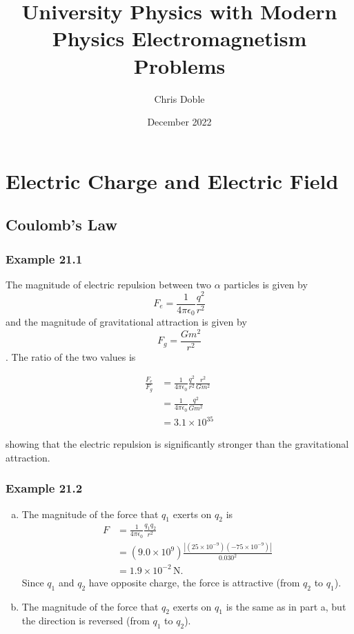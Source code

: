\documentclass{article}
\title{University Physics with Modern Physics Electromagnetism Problems}
\author{Chris Doble}
\date{December 2022}
\begin{document}
\maketitle

\tableofcontents

\setcounter{section}{20}
\section{Electric Charge and Electric Field}

\setcounter{subsection}{2}
\subsection{Coulomb's Law}

\subsubsection{Example 21.1}

The magnitude of electric repulsion between two $\alpha$ particles is given by \[F_e = \frac{1}{4\pi\epsilon_0}\frac{q^2}{r^2}\] and the magnitude of gravitational attraction is given by \[F_g = \frac{Gm^2}{r^2}\]. The ratio of the two values is

\begin{align*}
  \frac{F_e}{F_g} & = \frac{1}{4\pi\epsilon_0}\frac{q^2}{r^2}\frac{r^2}{Gm^2} \\
                  & = \frac{1}{4\pi\epsilon_0}\frac{q^2}{Gm^2}                \\
                  & = 3.1\times10^{35}
\end{align*}

showing that the electric repulsion is significantly stronger than the gravitational attraction.

\subsubsection{Example 21.2}

\begin{enumerate}[a)]
  \item The magnitude of the force that $q_1$ exerts on $q_2$ is
        \begin{align*}
          F & = \frac{1}{4\pi\epsilon_0}\frac{q_1q_2}{r^2}                                 \\
            & = (9.0 \times 10^9)\frac{|(25 \times 10^{-9})(-75 \times 10^{-9})|}{0.030^2} \\
            & = 1.9 \times 10^{-2}\,\textrm{N}.
        \end{align*}
        Since $q_1$ and $q_2$ have opposite charge, the force is attractive (from $q_2$ to $q_1$).

  \item The magnitude of the force that $q_2$ exerts on $q_1$ is the same as in part a, but the direction is reversed (from $q_1$ to $q_2$).
\end{enumerate}
\end{document}
